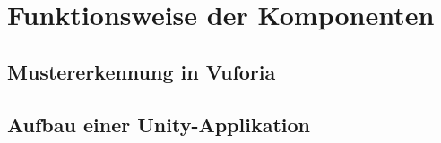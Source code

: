 \chapter{Funktionsweise der Komponenten}\label{ch:funktionsweise_der_komponenten}
\section{Mustererkennung in Vuforia}\label{mustererkennung_vuforia}
\section{Aufbau einer Unity-Applikation}